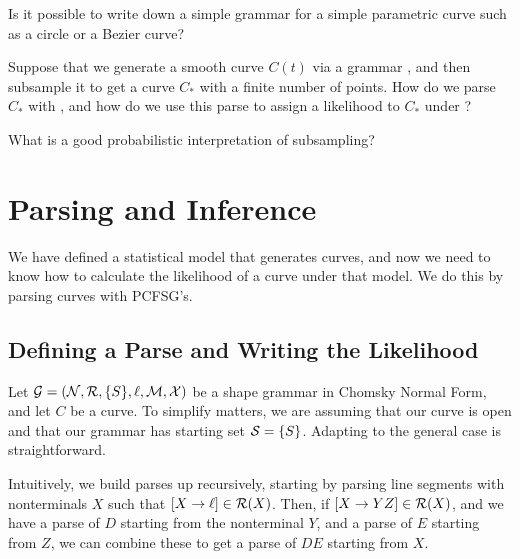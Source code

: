 \documentclass{article}
\begin{document}
\begin{q}
Is it possible to write down a simple grammar for a simple parametric
curve such as a circle or a Bezier curve?
\end{q}

\begin{q}
Suppose that we generate a smooth curve $C(t)$ via a grammar \GGG, and
then subsample it to get a curve $C_*$ with a finite number of
points. How do we parse $C_*$ with \GGG, and how do we use this parse
to assign a likelihood to $C_*$ under \GGG?
\end{q}

\begin{q}
What is a good probabilistic interpretation of subsampling?
\end{q}

\section{Parsing and Inference}

We have defined a statistical model that generates curves, and now we
need to know how to calculate the likelihood of a curve under that
model. We do this by parsing curves with PCFSG's.

\subsection{Defining a Parse and Writing the Likelihood}

Let ${\mathcal G} = ({\mathcal N}, {\mathcal R}, \{S\}, \ell, {\mathcal M}, {\mathcal X})$ be a shape grammar in
Chomsky Normal Form, and let $C$ be a curve. To simplify matters, we
are assuming that our curve is open and that our grammar has starting
set ${\mathcal S} = \{S\}$. Adapting to the general case is straightforward.

Intuitively, we build parses up recursively, starting by parsing line
segments with nonterminals $X$ such that $[X\to \ell]\in
{\mathcal R}(X)$. Then, if $[X\to YZ]\in {\mathcal R}(X)$, and we have a parse of $D$
starting from the nonterminal $Y$, and a parse of $E$ starting from
$Z$, we can combine these to get a parse of $DE$ starting from $X$.
\end{document}
